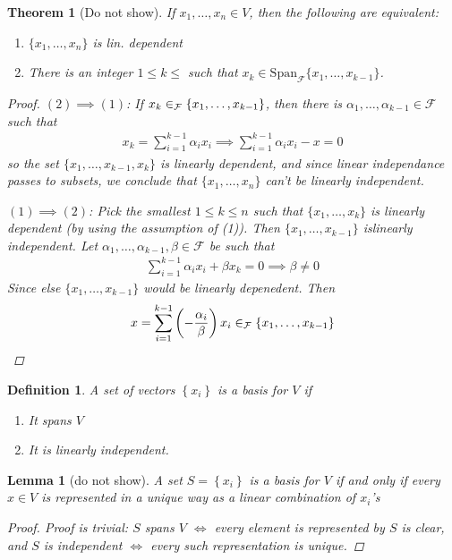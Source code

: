 \documentclass[10pt,twoside,openany,final]{memoir}
\theoremstyle{break}
\newtheorem{theorem}[section]{Theorem}
\newtheorem{lemma}[section]{Lemma}
\newtheorem{definition}[section]{Definition}
\theoremstyle{Break}
\newcommand{\F}{\mathcal{F}}
\let\Span\relax
\DeclareMathOperator{\Span}{Span}
\begin{document}
\begin{theorem}[Do not show]
	If $x_1,\dots,x_n \in V$, then the following are equivalent:
	\begin{enumerate}
		\item $\{x_1,\dots,x_n\}$ is lin. dependent
		\item There is an integer $1 \leq k \leq $ such that $x_k \in \mathrm{Span}_{\F} \{x_1,\dots,x_{k-1}\}$.
	\end{enumerate}
\begin{proof}
	$(2) \implies (1)$: If $x_k \in \Span_{\F}\left\{ x_1,\dots,x_{k-1} \right\}$, then there is $\alpha_1,\dots,\alpha_{k-1} \in \F$ such that
	\begin{align*}
		x_k = \sum_{i=1}^{k-1} \alpha_i x_i \implies \sum_{i=1}^{k-1}\alpha_i x_i - x = 0
	\end{align*}
	so the set $\{x_1,\dots,x_{k-1},x_k\}$ is linearly dependent, and since linear independance passes to subsets, we conclude that $\{x_1,\dots,x_n\}$ can't be linearly independent.
	
	
	$(1) \implies (2)$: Pick the smallest $1 \leq k \leq n$ such that $\{x_1,\dots,x_k\}$ is linearly dependent (by using the assumption of (1)). Then $\{x_1,\dots,x_{k-1}\}$ islinearly independent. Let $\alpha_1,\dots,\alpha_{k-1}, \beta \in \F$ be such that
	\begin{align*}
		\sum_{i=1}^{k-1}\alpha_i x_i + \beta x_k = 0 \implies \beta \neq 0	
	\end{align*}
	Since else $\{x_1,\dots,x_{k-1}\}$ would be linearly depenedent. Then 
	\begin{align*}
		x=\sum_{i=1}^{k-1}\left( - \frac{\alpha_i}{\beta} \right)x_i \in \Span_{\F}\{x_1,\dots,x_{k-1}\}
	\end{align*}
\end{proof}
\end{theorem}

\begin{definition}
	A set of vectors $\left\{ x_i \right\}$ is a basis for $V$ if
	\begin{enumerate}
		\item It spans $V$
		\item It is linearly independent.
	\end{enumerate}
\end{definition}

\begin{lemma}[do not show]
	A set $S=\left\{ x_i \right\}$ is a basis for $V$ if and only if every $x \in V$ is represented in a unique way as a linear combination of $x_i$'s
	\begin{proof}
	Proof is trivial: $S$ spans $V$ $\iff$ every element is represented by $S$ is clear, and $S$ is independent $\iff$ every such representation is unique.
	\end{proof}
\end{lemma}
\end{document}
